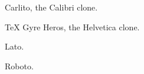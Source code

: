 \documentclass[letterpaper,11pt]{article}
\begin{document}
{\smokecarlito Carlito, the Calibri clone.}

{\smokeheros TeX Gyre Heros, the Helvetica clone.}

{\smokelato Lato.}

{\smokeroboto Roboto.}
\end{document}
